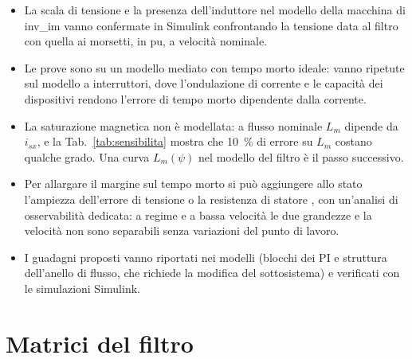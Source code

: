 \documentclass[10pt,a4paper]{scrartcl}
\begin{document}
\begin{onehalfspace}
\begin{itemize}
\item La scala di tensione e la presenza dell'induttore nel modello della macchina di inv\_im vanno confermate in Simulink confrontando la tensione data al filtro con quella ai morsetti, in pu, a velocità nominale.
\item Le prove sono su un modello mediato con tempo morto ideale: vanno ripetute sul modello a interruttori, dove l'ondulazione di corrente e le capacità dei dispositivi rendono l'errore di tempo morto dipendente dalla corrente.
\item La saturazione magnetica non è modellata: a flusso nominale $L_m$ dipende da $i_{sx}$, e la Tab.~\ref{tab:sensibilita} mostra che \SI{10}{\percent} di errore su $L_m$ costano qualche grado. Una curva $L_m(\psi)$ nel modello del filtro è il passo successivo.
\item Per allargare il margine sul tempo morto si può aggiungere allo stato l'ampiezza dell'errore di tensione o la resistenza di statore \cite{barut2008}, con un'analisi di osservabilità dedicata: a regime e a bassa velocità le due grandezze e la velocità non sono separabili senza variazioni del punto di lavoro.
\item I guadagni proposti vanno riportati nei modelli (blocchi dei PI e struttura dell'anello di flusso, che richiede la modifica del sottosistema) e verificati con le simulazioni Simulink.
\end{itemize}

\end{onehalfspace}

\appendix
\section{Matrici del filtro}
\label{app:matrici}
\end{document}
